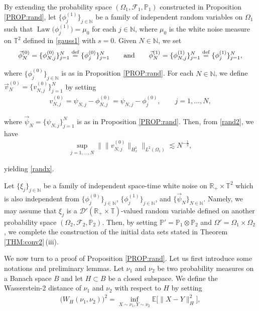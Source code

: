 \documentclass[letterpaper, 11pt,  reqno]{amsart}
\DeclareMathOperator{\Law}{Law}
\newcommand{\1}{\hspace{0.5mm}\text{I}\hspace{0.2mm}}
\newcommand{\noi}{\noindent}
\newcommand{\R}{\mathbb{R}}
\newcommand{\T}{\mathbb{T}}
\newcommand{\N}{\mathbb{N}}
\newcommand{\E}{\mathbb{E}}
\newcommand{\PP}{\mathbb{P}}
\newcommand{\D}{\mathcal{D}}
\newcommand{\les}{\lesssim}
\newcommand{\F}{\mathcal{F}}
\newcommand{\deff}{\stackrel{\textup{def}}{=}}
\renewcommand{\O}{\Omega}
\numberwithin{equation}{section}
\numberwithin{theorem}{section}
\begin{document}
By extending the probability space
$(\O_1, \F_1, \PP_1)$ constructed in Proposition \ref{PROP:rand}, 
let $\{ \phi^{(1)}_j \}_{j \in \N}$ be a family of independent random variables 
on $\O_1$ 
such that 
$\Law \big(\phi^{(1)}_j\big) = \mu_0$ for each $j \in \N$, 
where $\mu_0$ is  the white noise measure on $\T^2$ defined in \eqref{gauss1}
with $s = 0$.
Given $N \in \N$, we set
 \[\vec \phi^{(0)}_N =
\{ \phi^{(0)}_{N, j}\}_{j = 1}^N
\deff  
\{ \phi^{(0)}_{j}\}_{j = 1}^N 
\qquad \text{and}\qquad
\vec \phi^{(1)}_N =
\{ \phi^{(1)}_{N, j}\}_{j = 1}^N
\deff  
\{ \phi^{(1)}_{j}\}_{j = 1}^N , 
\]

\noi
where  $\{ \phi^{(0)}_{j} \}_{j \in \N}$ is as in Proposition \ref{PROP:rand}.
For each $N \in \N$, we  define $\vec v^{(0)}_N= \{v^{(0)}_{N, j}\}_{j = 1}^N$ by 
setting 
\begin{align}
v^{(0)}_{N, j} = \psi_{N, j}- \phi^{(0)}_{N, j}
= \psi_{N, j}- \phi^{(0)}_{j}, \qquad j = 1, \dots, N, 
\label{rand3}
\end{align}

\noi
where  $\vec \psi_N = \{\psi_{N, j}\}_{j = 1}^N$
is as in Proposition \ref{PROP:rand}.
Then, from \eqref{rand2}, we have
\begin{align*}
\sup_{j =1, \dots, N}\Big\|  \big\|v^{(0)}_{N, j} \big\|_{H^1_x}\Big\|_{L^2(\O_1)}
 \les N^{-\frac 12 } , 
\end{align*}

\noi
yielding \eqref{randx}.


Let $\{\xi_j \}_{j \in \N}$
be a family of independent space-time white noise
on $\R_+\times \T^2$
which is also independent 
from 
$\{ \phi^{(0)}_j \}_{j \in \N}$, 
$\{ \phi^{(1)}_j \}_{j \in \N}$, 
and $\{\vec \psi_N\}_{N \in \N}$.
Namely, we may assume that 
$\xi_j$
is a $\D'(\R_+\times \T)$-valued random variable
defined on another probability space
$(\O_2, \F_2, \PP_2)$.
Then, 
by setting $\PP' = \PP_1 \otimes \PP_2$
and $\O' = \O_1 \times \O_2$, 
we complete
the construction of 
the initial data sets stated in Theorem \ref{THM:conv2}\,(iii).










\medskip

We now turn to  a proof of Proposition \ref{PROP:rand}.
Let us first introduce some notations
and preliminary lemmas.
 Let $\nu_1$ and $\nu_2$ be two probability measures on a Banach space $B$ and let $H \subset B$ be a closed subspace. We define the Wasserstein-2 distance of $\nu_1$ and $\nu_2$ with respect to $H$ 
 by setting
 \begin{align}
\Big(W_H (\nu_1, \nu_2)\Big)^2 = \inf_{X \sim \nu_1, Y \sim \nu_2} \E \Big[ \| X - Y \|_H^2 \Big],
\label{Ruo1}
\end{align}
\end{document}
